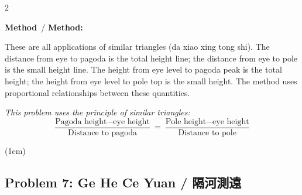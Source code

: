 \documentclass[11pt,a4paper]{article}
\newcommand{\meth}{\textbf{\color{methodcolor}Method}}
\begin{document}
\begin{paracol}{2}
\begin{rightcolumn}
\meth\ / \textbf{Method:}

These are all applications of similar triangles (da xiao xing tong shi). 
The distance from eye to pagoda is the total height line; the distance 
from eye to pole is the small height line. The height from eye level to 
pagoda peak is the total height; the height from eye level to pole top 
is the small height. The method uses proportional relationships between 
these quantities.

\medskip
\textit{This problem uses the principle of similar triangles:}
\[
\frac{\text{Pagoda height} - \text{eye height}}{\text{Distance to pagoda}} = 
\frac{\text{Pole height} - \text{eye height}}{\text{Distance to pole}}
\]
\end{rightcolumn}

\end{paracol}

\vspace(1em)

\subsection*{Problem 7: Ge He Ce Yuan / 隔河測遠}
\end{document}

